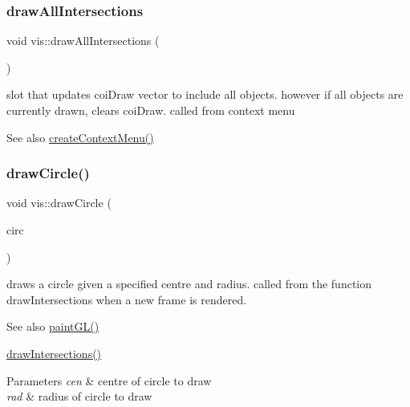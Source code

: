 \subsubsection{\texorpdfstring{draw\+All\+Intersections}{drawAllIntersections}}
{\footnotesize\ttfamily void vis\+::draw\+All\+Intersections (\begin{DoxyParamCaption}{ }\end{DoxyParamCaption})\hspace{0.3cm}{\ttfamily [slot]}}

slot that updates coi\+Draw vector to include all objects. however if all objects are currently drawn, clears coi\+Draw. called from context menu

\begin{DoxySeeAlso}{See also}
\mbox{\hyperlink{classvis_a63af66f730f0f06f36d255bcc7a7a244}{create\+Context\+Menu()}} 
\end{DoxySeeAlso}
\mbox{\label{classvis_a1b2fbed076352ace06cf7cbec8146be3}} 
\subsubsection{\texorpdfstring{draw\+Circle()}{drawCircle()}}
{\footnotesize\ttfamily void vis\+::draw\+Circle (\begin{DoxyParamCaption}\item[{\mbox{\hyperlink{structint_draw}{int\+Draw}}}]{circ }\end{DoxyParamCaption})}

draws a circle given a specified centre and radius. called from the function draw\+Intersections when a new frame is rendered.

\begin{DoxySeeAlso}{See also}
\mbox{\hyperlink{classvis_ace835462bb98cad495e829c08e1a26ea}{paint\+G\+L()}} 

\mbox{\hyperlink{classvis_aca1eb70cb49a572f7d34916aec3d95da}{draw\+Intersections()}} 
\end{DoxySeeAlso}

\begin{DoxyParams}{Parameters}
{\em cen} & centre of circle to draw \\
\hline
{\em rad} & radius of circle to draw \\
\hline
\end{DoxyParams}
\mbox{\label{classvis_a279ffabf91a5426cbfafd520d19edd45}} 
